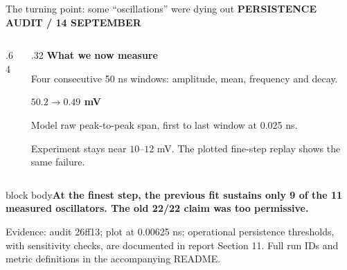 \documentclass[aspectratio=169,11pt]{beamer}
\newcommand{\eyebrow}[1]{{\color{teal}\scriptsize\bfseries\MakeUppercase{#1}}\par\vspace{2mm}}
\newcommand{\takeaway}[1]{\par\vspace{2mm}\begin{beamercolorbox}[sep=2mm,wd=\linewidth]{block body}\small\bfseries #1\end{beamercolorbox}}
\newcommand{\src}[1]{\par\vfill{\fontsize{6.5}{8}\selectfont\color{muted}Evidence: #1. Full run IDs and metric definitions in the accompanying README.\par}}
\newcommand{\key}[2]{\par{\color{teal}\Large\bfseries #1}\par\small #2\par}
\begin{document}
\begin{frame}[t]{The turning point: some ``oscillations'' were dying out}
\eyebrow{Persistence audit / 14 September}
\begin{columns}[T,onlytextwidth]
\begin{column}{.64\textwidth}
\end{column}
\begin{column}{.32\textwidth}
\textbf{What we now measure}\par\vspace{2mm}
\small Four consecutive 50 ns windows: amplitude, mean, frequency and decay.
\vspace{3mm}
\key{$50.2\rightarrow0.49$ mV}{Model raw peak-to-peak span, first to last window at 0.025 ns.}
\vspace{2mm}
\small Experiment stays near $10$--$12$ mV. The plotted fine-step replay shows the same failure.
\end{column}
\end{columns}
\vspace{4mm}
\takeaway{At the finest step, the previous fit sustains only 9 of the 11 measured oscillators. The old 22/22 claim was too permissive.}
\src{audit 26ff13; plot at 0.00625 ns; operational persistence thresholds, with sensitivity checks, are documented in report Section 11}
\end{frame}
\end{document}
